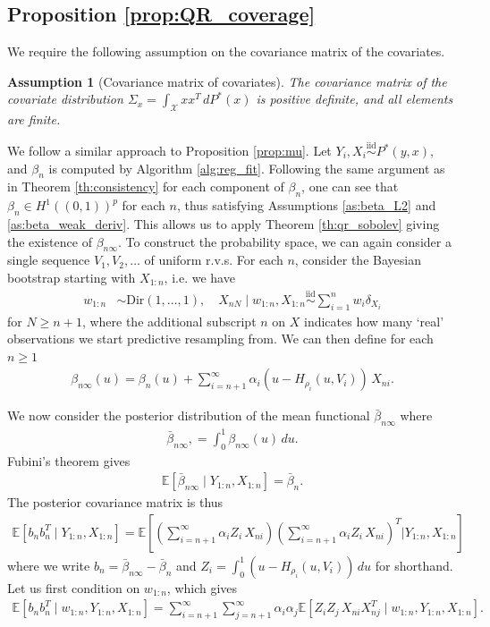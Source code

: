 \documentclass[11pt,a4paper]{article}
\newtheorem{as}{Assumption}
\newcommand{\iid}{\overset{\mathrm{iid}}{\sim}}
\newcommand{\E}{\mathbb{E}}
\begin{document}
\begin{appendices}
\subsection{Proposition \ref{prop:QR_coverage}}
We require the following assumption on the covariance matrix of the covariates.
\begin{as}[Covariance matrix of covariates]\label{app:as_covariates_cov} 
The covariance matrix of the covariate distribution $\Sigma_x = \int_{\mathcal{X}} x x^T \, dP^*(x)$ is positive definite, and all elements are finite. 
\end{as}

We follow a similar approach to {Proposition \ref{prop:mu}}. Let $Y_i,X_i \iid P^*(y,x)$, and $\beta_n$ is computed by {Algorithm \ref{alg:reg_fit}}.
Following the same argument as in {Theorem \ref{th:consistency}} for each component of $\beta_n$, one can see that $\beta_n \in H^1((0,1))^p$ for each $n$, thus satisfying {Assumptions \ref{as:beta_L2}} and {\ref{as:beta_weak_deriv}}. This allows us to apply {Theorem \ref{th:qr_sobolev}} giving the existence of $\beta_{n\infty}$. To construct the probability space, we can again consider a single sequence $V_1,V_2,\ldots$ of uniform r.v.s.
For each $n$, consider the Bayesian bootstrap starting with $X_{1:n}$, i.e. we have
\begin{align*}
    w_{1:n}&\sim \text{Dir}(1,\ldots,1), \quad 
    X_{nN} \mid w_{1:n}, X_{1:n} \iid \sum_{i = 1}^n w_i \delta_{X_i}
\end{align*}
for $N \geq n+1$, where the additional subscript $n$ on $X$ indicates how many `real' observations we start predictive resampling from. 
We can then define for each $n \geq 1$
\begin{align*}
    \beta_{n\infty}(u) = \beta_n(u) + \sum_{i = n+1}^\infty \alpha_i \left(u - H_{\rho_i}(u,V_i)\right)\, X_{ni}.
\end{align*}


We now consider the posterior distribution of the mean functional $\bar{\beta}_{n\infty}$ where
\begin{align*}
\bar{\beta}_{n\infty}, = \int_0^1 \beta_{n\infty}(u) \, du.
\end{align*}
Fubini's theorem gives 
\begin{align*}
\E[\bar{\beta}_{n\infty}\mid Y_{1:n},X_{1:n}] = \bar{\beta}_n.
\end{align*}
The posterior covariance matrix is thus
\begin{align*}
    \E[b_n b_n^T \mid Y_{1:n},X_{1:n}] = \E\left[\left(\sum_{i = n+1}^\infty \alpha_i Z_i\, X_{ni}\right)\left(\sum_{i = n+1}^\infty \alpha_i Z_i\, X_{ni}\right)^T \Big| Y_{1:n},X_{1:n}\right]
\end{align*}
where we write $b_n = \bar{\beta}_{n\infty}- \bar{\beta}_n$ and $Z_i = \int_0^1\left(u - H_{\rho_{i}}(u,V_i)\right)\, du$ for shorthand.
Let us first condition on $w_{1:n}$, which gives
\begin{align*}
 \E[b_n b_n^T\mid w_{1:n},Y_{1:n},X_{1:n}] = 
\sum_{i = n+1}^\infty \sum_{j = n+1}^\infty \alpha_i\alpha_j \E\left[ Z_iZ_j\, X_{ni}X_{nj}^T \mid w_{1:n}, Y_{1:n},X_{1:n}\right].
\end{align*}
    

\end{appendices}
\end{document}
